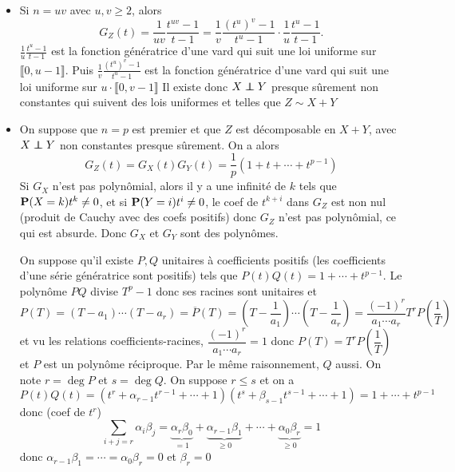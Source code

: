 \begin{itemize}
    \item Si $n=uv$ avec  $u,v\geq 2$, alors \[
            G_Z(t)=\frac{1}{uv} \frac{t^{uv}-1}{t-1}=\frac{1}{v} \frac{(t^u)^v-1}{t^u-1} \cdot \frac{1}{u} \frac{t^u-1}{t-1}.
    \]
    $\displaystyle \frac{1}{u} \frac{t^u-1}{t-1}$ est la fonction génératrice d'une vard qui suit une loi uniforme sur $\llbracket 0,u-1 \rrbracket $. Puis $\displaystyle \frac{1}{v}\frac{(t^u)^v-1}{t^u-1}$ est la fonction génératrice d'une vard qui suit une loi uniforme sur $u\cdot \llbracket 0,v-1 \rrbracket $
     Il existe donc $X\indep Y$ presque sûrement non constantes qui suivent des lois uniformes et telles que  $Z\sim X+Y$

 \item On suppose que $n=p$ est premier et que $Z$ est décomposable en $X+Y$, avec  $X\indep Y$ non constantes presque sûrement. On a alors \[
         G_Z(t)=G_X(t)G_Y(t)=\frac{1}{p} (1+t+\cdots +t^{p-1})
 \] 
 Si $G_X$ n'est pas polynômial, alors il y a une infinité de $k$ tels que $\P(X=k)t^k\neq 0$, et si $\P(Y=i)t^i\neq 0$, le coef de $t^{k+i}$ dans  $G_Z$ est non nul (produit de Cauchy avec des coefs positifs) donc  $G_Z$ n'est pas polynômial, ce qui est absurde. Donc $G_X$ et  $G_Y$ sont des polynômes.

 On suppose qu'il existe  $P, Q$ unitaires à coefficients positifs (les coefficients d'une série génératrice sont positifs) tels que  $P(t)Q(t)=1+\cdots +t^{p-1}$. Le polynôme $PQ$ divise $T^p-1$ donc ses racines sont unitaires et  \[
     P(T)=(T-a_1)\cdots (T-a_r)=\overline{P}(T)=\left( T-\frac{1}{a_1} \right) \cdots \left( T-\frac{1}{a_r} \right) = \frac{(-1)^r}{a_1\cdots a_r}T^rP\left( \frac{1}{T} \right) 
 \] 
 et vu les relations coefficients-racines, $\dfrac{(-1)^r}{a_1\cdots a_r}=1$ donc $P(T)=T^r P\left( \dfrac 1T \right) $ et $P$ est un polynôme réciproque. Par le même raisonnement,  $Q$ aussi. On note  $r=\deg P$ et  $s=\deg Q$. On suppose  $r\leq s$ et on a \[
     P(t)Q(t)=(t^r+\alpha_{r-1}t^{r-1}+\cdots +1)(t^s+\beta_{s-1}t^{s-1}+\cdots +1)=1+\cdots +t^{p-1}
 \] 
 donc (coef de $t^r$)\[
     \sum_{i+j=r}\alpha_i\beta_j= \underbrace{\alpha_r\beta_0}_{=1}+\underbrace{\alpha_{r-1}\beta_1}_{\geq 0}+\cdots +\underbrace{\alpha_0\beta_r}_{\geq 0}=1
 \] 
 donc $\alpha_{r-1}\beta_1=\cdots =\alpha_0\beta_r=0$ et $\beta_r=0$


\end{itemize}
